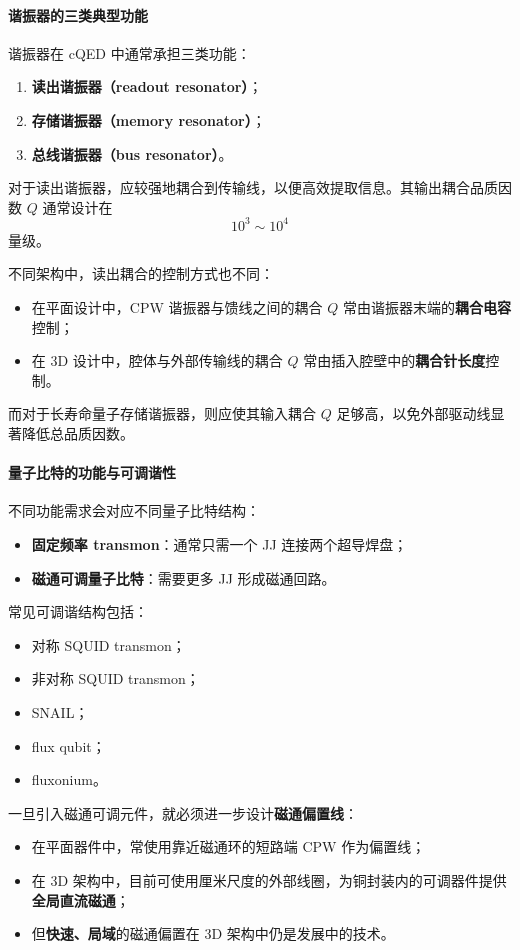 \documentclass[12pt,a4paper,oneside]{ctexbook}
\begin{document}
\paragraph{谐振器的三类典型功能}
谐振器在 cQED 中通常承担三类功能：
\begin{enumerate}
    \item \textbf{读出谐振器（readout resonator）}；
    \item \textbf{存储谐振器（memory resonator）}；
    \item \textbf{总线谐振器（bus resonator）}。
\end{enumerate}

对于读出谐振器，应较强地耦合到传输线，以便高效提取信息。其输出耦合品质因数 \(Q\) 通常设计在
\[
10^3 \sim 10^4
\]
量级。

不同架构中，读出耦合的控制方式也不同：
\begin{itemize}
    \item 在平面设计中，CPW 谐振器与馈线之间的耦合 \(Q\) 常由谐振器末端的\textbf{耦合电容}控制；
    \item 在 3D 设计中，腔体与外部传输线的耦合 \(Q\) 常由插入腔壁中的\textbf{耦合针长度}控制。
\end{itemize}

而对于长寿命量子存储谐振器，则应使其输入耦合 \(Q\) 足够高，以免外部驱动线显著降低总品质因数。

\paragraph{量子比特的功能与可调谐性}
不同功能需求会对应不同量子比特结构：
\begin{itemize}
    \item \textbf{固定频率 transmon}：通常只需一个 JJ 连接两个超导焊盘；
    \item \textbf{磁通可调量子比特}：需要更多 JJ 形成磁通回路。
\end{itemize}

常见可调谐结构包括：
\begin{itemize}
    \item 对称 SQUID transmon；
    \item 非对称 SQUID transmon；
    \item SNAIL；
    \item flux qubit；
    \item fluxonium。
\end{itemize}

一旦引入磁通可调元件，就必须进一步设计\textbf{磁通偏置线}：
\begin{itemize}
    \item 在平面器件中，常使用靠近磁通环的短路端 CPW 作为偏置线；
    \item 在 3D 架构中，目前可使用厘米尺度的外部线圈，为铜封装内的可调器件提供\textbf{全局直流磁通}；
    \item 但\textbf{快速、局域}的磁通偏置在 3D 架构中仍是发展中的技术。
\end{itemize}
\end{document}
